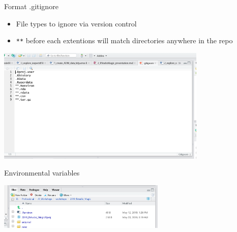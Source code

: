 \documentclass[ignorenonframetext,]{beamer}
\providecommand{\tightlist}{%
  \setlength{\itemsep}{0pt}\setlength{\parskip}{0pt}}
\begin{document}
\begin{frame}[fragile]{Format .gitignore}
\protect\hypertarget{format-.gitignore}{}

\begin{itemize}
\tightlist
\item
  File types to ignore via version control
\item
  \texttt{**} before each extentions will match directories anywhere in
  the repo
\end{itemize}

\includegraphics[width=0.75\textwidth,height=\textheight]{../external/images/gitignore.PNG}

\end{frame}

\begin{frame}{Environmental variables}
\protect\hypertarget{environmental-variables}{}

\includegraphics[width=0.6\textwidth,height=\textheight]{../external/images/Revniron.PNG}

\end{frame}
\end{document}
